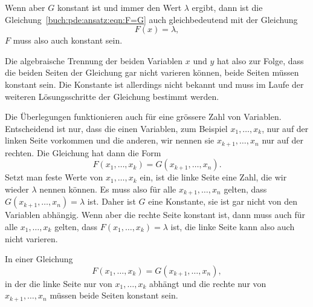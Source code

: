 Wenn aber $G$ konstant ist und immer den Wert $\lambda$ ergibt, dann
ist die Gleichung~\eqref{buch:pde:ansatz:eqn:F=G} auch gleichbedeutend
mit der Gleichung
\[
F(x) = \lambda,
\]
$F$ muss also auch konstant sein.

Die algebraische Trennung der beiden Variablen $x$ und $y$ hat also 
zur Folge, dass die beiden Seiten der Gleichung gar nicht varieren
können, beide Seiten müssen konstant sein.
Die Konstante ist allerdings nicht bekannt und muss im Laufe der
weiteren Lösungsschritte der Gleichung bestimmt werden.

Die Überlegungen funktionieren auch für eine grössere Zahl von
Variablen.
Entscheidend ist nur, dass die einen Variablen, zum Beispiel
$x_1,\dots,x_k$, nur auf der linken Seite vorkommen und die anderen,
wir nennen sie $x_{k+1},\dots,x_n$ nur auf der rechten.
Die Gleichung hat dann die Form
\begin{equation}
F(x_1,\dots,x_k)
=
G(x_{k+1},\dots,x_n).
\label{buch:pde:ansatz:eqn:FF=GG}
\end{equation}
Setzt man feste Werte von $x_1,\dots,x_k$ ein, ist die linke Seite
eine Zahl, die wir wieder $\lambda$ nennen können.
Es muss also für alle $x_{k+1},\dots,x_n$ gelten, dass
$G(x_{k+1},\dots,x_n)=\lambda$ ist.
Daher ist $G$ eine Konstante, sie ist gar nicht von den Variablen
abhängig.
Wenn aber die rechte Seite konstant ist, dann muss auch für alle
$x_1,\dots,x_k$ gelten, dass $F(x_1,\dots,x_k)=\lambda$ ist,
die linke Seite kann also auch nicht varieren.

\begin{prinzip}
In einer Gleichung
\[
F(x_1,\dots,x_k) = G(x_{k+1},\dots,x_n),
\]
in der die linke Seite nur von $x_1,\dots,x_k$ abhängt und die
rechte nur von $x_{k+1},\dots,x_n$ müssen beide Seiten konstant sein.
\end{prinzip}

%
%
